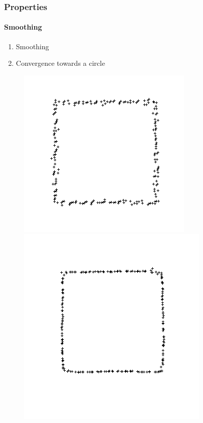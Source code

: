 \documentclass{beamer}
\begin{document}
\begin{frame}
    \frametitle{Properties}
    \framesubtitle{Smoothing}


    \begin{enumerate}
        \item Smoothing
        \item Convergence towards a circle
    \end{enumerate}

    \begin{figure}
        \centering
        \includegraphics[scale=0.2]{img/square-noisy-3-15-01}
        \includegraphics[scale=0.2]{img/square-noisy-3-15-01-3}

\end{figure}
\end{frame}
\end{document}

